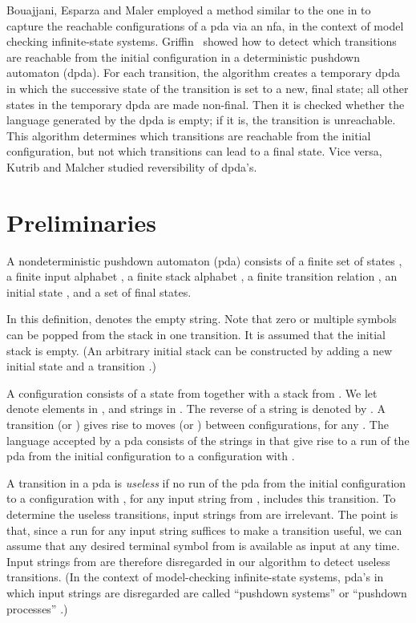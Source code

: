 \documentclass{llncs}
\begin{document}
Bouajjani, Esparza and Maler \cite{BouajjaniEM97} employed a method similar to the one in \cite{FinkelWW97}
to capture the reachable configurations of a pda via an nfa, in the context of model checking infinite-state systems.
Griffin~\cite{Griffin06} showed how to detect which transitions are reachable
from the initial configuration in a deterministic pushdown automaton (dpda).
For each transition, the algorithm creates a temporary dpda in which the
successive state of the transition is set to a new, final state; all other
states in the temporary dpda are made non-final. Then it is checked whether the
language generated by the dpda is empty; if it is, the transition is unreachable.
This algorithm determines which transitions are reachable
from the initial configuration, but not which transitions can lead to a final state.
Vice versa, Kutrib and Malcher \cite{KutribMalcher12} studied reversibility of dpda's.




\section{Preliminaries}

\begin{definition}\label{def:NPDA}
A nondeterministic pushdown automaton (pda) consists of
a finite set of states , a finite input alphabet , a finite stack alphabet ,
a finite transition relation ,
an initial state , and a set  of final states.
\end{definition}

\noindent
In this definition,  denotes the empty string. Note that
zero or multiple symbols can be popped from the stack in one transition.
It is assumed that the initial stack is empty. (An arbitrary initial stack  can be constructed
by adding a new initial state  and a transition .)

A configuration consists of a state from  together with a stack from .
We let  denote elements in , and  strings in .
The reverse of a string  is denoted by .
A transition  (or )
gives rise to moves  (or )
between configurations, for any .
The language accepted by a pda consists of the strings in  that give rise to a run
of the pda from the initial configuration  to a configuration  with .

A transition in a pda is \emph{useless} if no run of the pda from the initial configuration
 to a configuration  with , for any input string from ,
includes this transition. To determine the useless transitions, input strings from  are irrelevant.
The point is that, since a run for any input string suffices to make a transition useful,
we can assume that any desired terminal symbol from  is available as input at any time.
Input strings from  are therefore disregarded in our algorithm to detect useless transitions.
(In the context of model-checking infinite-state systems, pda's in which input strings are disregarded
are called ``pushdown systems'' or ``pushdown processes'' \cite{Walukiewicz96}.)
\end{document}
